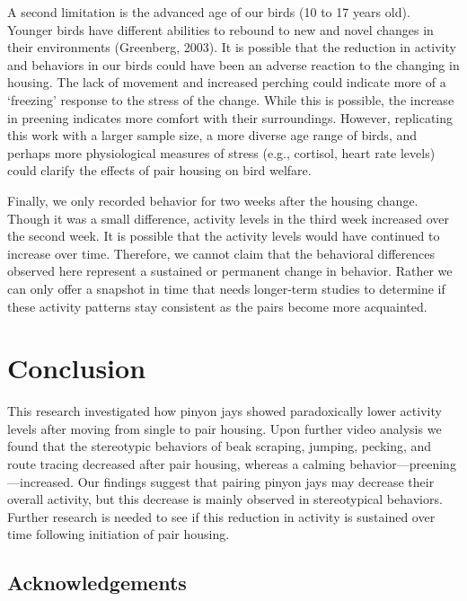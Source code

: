 \documentclass[
  pub]{apa6}
\begin{document}
A second limitation is the advanced age of our birds (10 to 17 years old). Younger birds have different abilities to rebound to new and novel changes in their environments (Greenberg, 2003). It is possible that the reduction in activity and behaviors in our birds could have been an adverse reaction to the changing in housing. The lack of movement and increased perching could indicate more of a `freezing' response to the stress of the change. While this is possible, the increase in preening indicates more comfort with their surroundings. However, replicating this work with a larger sample size, a more diverse age range of birds, and perhaps more physiological measures of stress (e.g., cortisol, heart rate levels) could clarify the effects of pair housing on bird welfare.

Finally, we only recorded behavior for two weeks after the housing change. Though it was a small difference, activity levels in the third week increased over the second week. It is possible that the activity levels would have continued to increase over time. Therefore, we cannot claim that the behavioral differences observed here represent a sustained or permanent change in behavior. Rather we can only offer a snapshot in time that needs longer-term studies to determine if these activity patterns stay consistent as the pairs become more acquainted.

\hypertarget{conclusion}{%
\section{Conclusion}\label{conclusion}}

This research investigated how pinyon jays showed paradoxically lower activity levels after moving from single to pair housing. Upon further video analysis we found that the stereotypic behaviors of beak scraping, jumping, pecking, and route tracing decreased after pair housing, whereas a calming behavior---preening---increased. Our findings suggest that pairing pinyon jays may decrease their overall activity, but this decrease is mainly observed in stereotypical behaviors. Further research is needed to see if this reduction in activity is sustained over time following initiation of pair housing.

\hypertarget{acknowledgements}{%
\subsection{Acknowledgements}\label{acknowledgements}}
\end{document}
